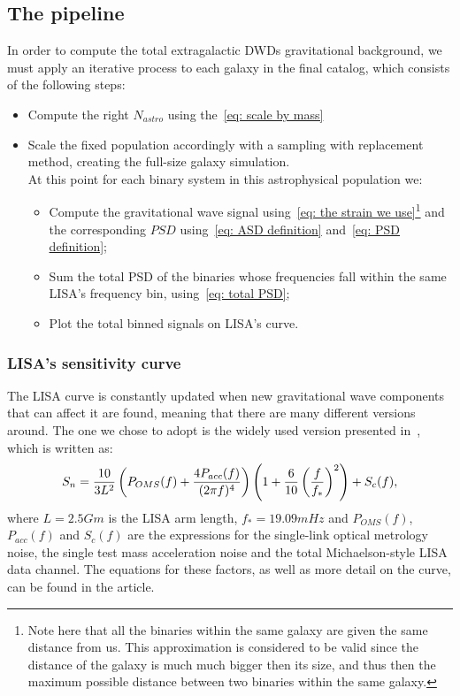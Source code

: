 \subsection{The pipeline}
In order to compute the total extragalactic DWDs gravitational background, we must apply an iterative process to each galaxy in the final catalog, which consists of the following steps:
\begin{itemize}
    \item Compute the right $N_{astro}$ using the~\eqref{eq: scale by mass}
    \item Scale the fixed population accordingly with a sampling with replacement method, creating the full-size galaxy simulation.
    \vspace{1.5mm}\\
    At this point for each binary system in this astrophysical population we:
    \begin{itemize}
        \item Compute the gravitational wave signal using~\eqref{eq: the strain we use}\footnote{Note here that all the binaries within the same galaxy are given the same distance from us. This approximation is considered to be valid since the distance of the galaxy is much much bigger then its size, and thus then the maximum possible distance between two binaries within the same galaxy.} and the corresponding $PSD$ using~\eqref{eq: ASD definition} and~\eqref{eq: PSD definition};
        \item Sum the total PSD of the binaries whose frequencies fall within the same LISA's frequency bin, using~\eqref{eq: total PSD};
        \item Plot the total binned signals on LISA's curve.
    \end{itemize}
\end{itemize}
\subsubsection{LISA's sensitivity curve}
The LISA curve is constantly updated when new gravitational wave components that can affect it are found, meaning that there are many different versions around.
The one we chose to adopt is the widely used version presented in~\cite{Robson_2019}, which is written as:
\begin{equation}
    S_n = \frac{10}{3L^2} \left( P_{OMS}(f) + \frac{4P_{acc}(f)}{(2\pi f)^4} \right)\left( 1 + \frac{6}{10}\left(\frac{f}{f_*}\right)^2 \right) + S_c(f),
    \notag
\end{equation}
where $L=2.5 Gm$ is the LISA arm length, $f_*=19.09mHz$ and $P_{OMS}(f)$, $P_{acc}(f)$ and $S_c(f)$ are the expressions for the single-link optical metrology noise, the single test mass acceleration noise and the total Michaelson-style LISA data channel. 
The equations for these factors, as well as more detail on the curve, can be found in the article.


